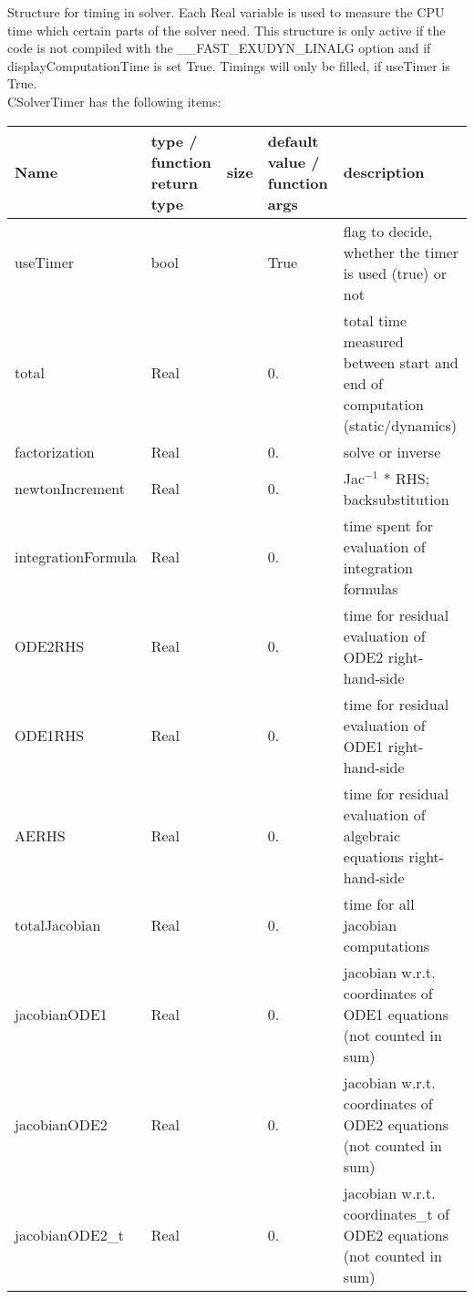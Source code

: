  \label{sec:CSolverTimer}
Structure for timing in solver. Each Real variable is used to measure the CPU time which certain parts of the solver need. This structure is only active if the code is not compiled with the \_\_FAST\_EXUDYN\_LINALG option and if displayComputationTime is set True. Timings will only be filled, if useTimer is True.\\ 
%
CSolverTimer has the following items:
\begin{center}
  \footnotesize
  \begin{longtable}{| p{4.2cm} | p{2.5cm} | p{0.3cm} | p{3.0cm} | p{6cm} |}
    \hline
    \bf Name & \bf type / function return type & \bf size & \bf default value / function args & \bf description \\ \hline
    useTimer &     bool &      &     True &     flag to decide, whether the timer is used (true) or not\\ \hline
    total &     Real &      &     0. &     total time measured between start and end of computation (static/dynamics)\\ \hline
    factorization &     Real &      &     0. &     solve or inverse\\ \hline
    newtonIncrement &     Real &      &     0. &     Jac$^{-1}$ * RHS; backsubstitution\\ \hline
    integrationFormula &     Real &      &     0. &     time spent for evaluation of integration formulas\\ \hline
    ODE2RHS &     Real &      &     0. &     time for residual evaluation of ODE2 right-hand-side\\ \hline
    ODE1RHS &     Real &      &     0. &     time for residual evaluation of ODE1 right-hand-side\\ \hline
    AERHS &     Real &      &     0. &     time for residual evaluation of algebraic equations right-hand-side\\ \hline
    totalJacobian &     Real &      &     0. &     time for all jacobian computations\\ \hline
    jacobianODE1 &     Real &      &     0. &     jacobian w.r.t. coordinates of ODE1 equations (not counted in sum)\\ \hline
    jacobianODE2 &     Real &      &     0. &     jacobian w.r.t. coordinates of ODE2 equations (not counted in sum)\\ \hline
    jacobianODE2\_t &     Real &      &     0. &     jacobian w.r.t. coordinates\_t of ODE2 equations (not counted in sum)\\ \hline

\end{longtable}
\end{center}
